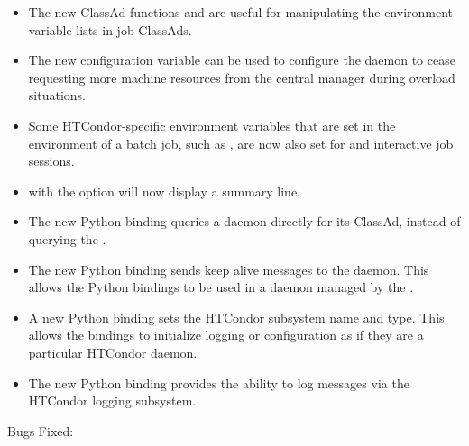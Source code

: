 \begin{itemize}
\item The new ClassAd functions  and 
 are
useful for manipulating the environment variable lists in job ClassAds.

\item The new configuration variable 
can be used to configure the  daemon
 to cease requesting more machine resources
from the central manager during overload situations.

\item Some HTCondor-specific environment variables that are set in the
environment of a batch job, such as ,
 are now also set for
 and interactive job sessions.

\item {} with the  option will now display
a summary line.

\item The new  Python binding queries a daemon
directly for its ClassAd, 
instead of querying the .

\item The new  Python binding sends keep alive
messages to the  daemon. This allows the Python bindings to be
used in a daemon managed by the .

\item A new Python binding sets the HTCondor subsystem name and type.
This allows the bindings to initialize logging or configuration as if they
are a particular HTCondor daemon.

\item The new  Python binding provides the ability
 to log messages via the HTCondor logging subsystem.

\end{itemize}

\noindent Bugs Fixed:

